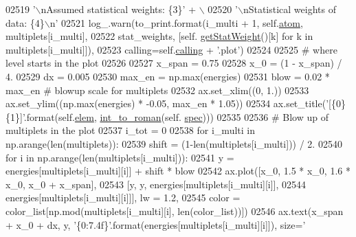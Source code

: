 \begin{DoxyCode}
02519                              \textcolor{stringliteral}{'\(\backslash\)nAssumed statistical weights: \{3\}'} + \(\backslash\)
02520                              \textcolor{stringliteral}{'\(\backslash\)nStatistical weights of data: \{4\}\(\backslash\)n'}
02521                     log\_.warn(to\_print.format(i\_multi + 1, self.\hyperlink{classpyneb_1_1core_1_1pynebcore_1_1_atom_a192f3e20446d7fba81d789bc705d6c71}{atom}, multiplets[i\_multi], 
02522                                                  stat\_weights, [self.
      \hyperlink{classpyneb_1_1core_1_1pynebcore_1_1_atom_a0f2483487115f19556586b9e422bd5fb}{getStatWeight}()[k] \textcolor{keywordflow}{for} k \textcolor{keywordflow}{in} multiplets[i\_multi]]), 
02523                                  calling=self.\hyperlink{classpyneb_1_1core_1_1pynebcore_1_1_atom_a373b7735acf4f528b54bddf373ad67a1}{calling} + \textcolor{stringliteral}{'.plot'})
02524 
02525         \textcolor{comment}{# where level starts in the plot}
02526        
02527         x\_span = 0.75
02528         x\_0 = (1 - x\_span) / 4.    
02529         dx = 0.005
02530         max\_en = np.max(energies)
02531         blow = 0.02 * max\_en \textcolor{comment}{# blowup scale for multiplets}
02532         ax.set\_xlim((0, 1.))
02533         ax.set\_ylim((np.max(energies) * -0.05, max\_en * 1.05))
02534         ax.set\_title(\textcolor{stringliteral}{'[\{0\} \{1\}]'}.format(self.\hyperlink{classpyneb_1_1core_1_1pynebcore_1_1_atom_ae722bd0e35e1c8cdc0018d56c34171cf}{elem}, \hyperlink{namespacepyneb_1_1utils_1_1misc_a7a4c4b4ba1c884da72e0ea05aa8fb90b}{int\_to\_roman}(self.
      \hyperlink{classpyneb_1_1core_1_1pynebcore_1_1_atom_a02c0f7146a2f5b8eac765a453c763797}{spec})))
02535 
02536         \textcolor{comment}{# Blow up of multiplets in the plot}
02537         i\_tot = 0
02538         \textcolor{keywordflow}{for} i\_multi \textcolor{keywordflow}{in} np.arange(len(multiplets)):
02539             shift = (1-len(multiplets[i\_multi])) / 2.
02540             \textcolor{keywordflow}{for} i \textcolor{keywordflow}{in} np.arange(len(multiplets[i\_multi])):
02541                 y = energies[multiplets[i\_multi][i]] + shift * blow
02542                 ax.plot([x\_0, 1.5 * x\_0, 1.6 * x\_0, x\_0 + x\_span], 
02543                          [y, y, energies[multiplets[i\_multi][i]], 
02544                           energies[multiplets[i\_multi][i]]], lw = 1.2, 
02545                          color = color\_list[np.mod(multiplets[i\_multi][i], len(color\_list))])
02546                 ax.text(x\_span + x\_0 + dx, y, \textcolor{stringliteral}{'\{0:7.4f\}'}.format(energies[multiplets[i\_multi][i]]), size=\textcolor{stringliteral}{'
}
\end{DoxyCode}
